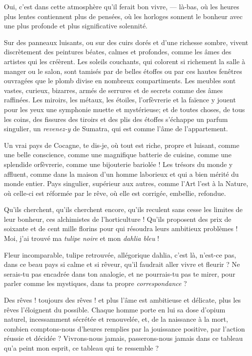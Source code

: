 Oui, c’est dans cette atmosphère qu’il
ferait bon vivre, --- là{}-bas, où les heures plus lentes contiennent
plus de pensées, où les horloges sonnent le bonheur avec une plus
profonde et plus significative solennité.

Sur des panneaux luisants, ou sur des cuirs dorés et
d’une richesse sombre, vivent discrètement des
peintures béates, calmes et profondes, comme les âmes des artistes qui
les créèrent. Les soleils couchants, qui colorent si richement la salle
à manger ou le salon, sont tamisés par de belles étoffes ou par ces
hautes fenêtres ouvragées que le plomb divise en nombreux
compartiments. Les meubles sont vastes, curieux, bizarres, armés de
serrures et de secrets comme des âmes raffinées. Les miroirs, les
métaux, les étoiles, l’orfèvrerie et la faïence y
jouent pour les yeux une symphonie muette et mystérieuse; et de toutes
choses, de tous les coins, des fissures des tiroirs et des plis des
étoffes s’échappe un parfum singulier, un \textit{revenez{}-y}
de Sumatra, qui est comme l’âme de
l’appartement.

Un vrai pays de Cocagne, te dis{}-je, où tout est riche, propre et
luisant, comme une belle conscience, comme une magnifique batterie de
cuisine, comme une splendide orfèvrerie, comme une bijouterie bariolée
! Les trésors du monde y affluent, comme dans la maison
d’un homme laborieux et qui a bien mérité du monde
entier. Pays singulier, supérieur aux autres, comme
l’Art l’est à la Nature, où
celle{}-ci est réformée par le rêve, où elle est corrigée, embellie,
refondue.

Qu’ils cherchent, qu’ils cherchent
encore, qu’ils reculent sans cesse les limites de leur
bonheur, ces alchimistes de l’horticulture !
Qu’ils proposent des prix de soixante et de cent mille
florins pour qui résoudra leurs ambitieux problèmes ! Moi,
j’ai trouvé ma \textit{tulipe noire} et mon \textit{dahlia bleu} !

Fleur incomparable, tulipe retrouvée, allégorique dahlia,
c’est là, n’est{}-ce pas, dans ce
beau pays si calme et si rêveur, qu’il faudrait aller
vivre et fleurir ? Ne serais{}-tu pas encadrée dans ton analogie, et ne
pourrais{}-tu pas te mirer, pour parler comme les mystiques, dans ta
propre \textit{correspondance} ?

Des rêves ! toujours des rêves ! et plus l’âme est
ambitieuse et délicate, plus les rêves l’éloignent du
possible. Chaque homme porte en lui sa dose d’opium
naturel, incessamment sécrétée et renouvelée, et, de la naissance à la
mort, combien comptons{}-nous d’heures remplies par la
jouissance positive, par l’action réussie et décidée ?
Vivrons{}-nous jamais, passerons{}-nous jamais dans ce tableau
qu’a peint mon esprit, ce tableau qui te ressemble ?

